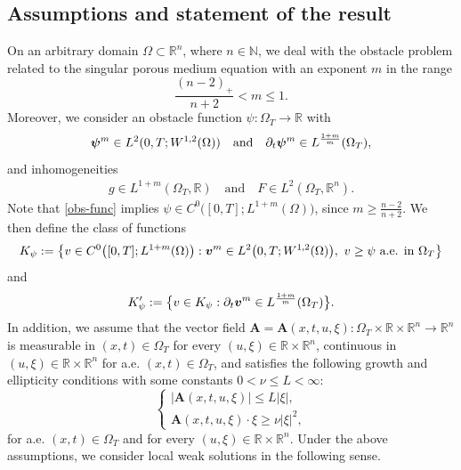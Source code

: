 \documentclass[a4paper, 10pt, american]{amsart}
\numberwithin{theorem}{section}
\numberwithin{equation}{section}
\def\N{\mathbb{N}}
\def\R{\mathbb{R}}
\newcommand{\power}[2]{\bm{#1^{\mbox{\unboldmath{\scriptsize$#2$}}}}}
\begin{document}
\subsection{Assumptions and statement of the result}
\label{sec:result}
On an arbitrary domain $\Omega\subset\R^n$, where $n\in\N$,
we deal with the obstacle problem related to
the singular porous medium equation with an exponent $m$
in the range
\begin{equation}
  \label{range-m}
  \frac{(n-2)_+}{n+2}<m\le1.
\end{equation}
Moreover, we consider an obstacle function $\psi : \Omega_T \rightarrow \R$ with
\begin{equation}\label{obs-func}
\power \psi m \in L^2(0,T; W^{1,2}(\Omega))\quad\mbox{and} \quad \partial_t \power \psi m \in L^{\frac{1+m}{m}}(\Omega_T),
\end{equation}
and inhomogeneities
\begin{align}\label{inhom-func}
g\in L^{1+m}(\Omega_T,\R)
\quad\mbox{and}\quad
F\in L^2(\Omega_T,\R^n).
\end{align}
Note that \eqref{obs-func} implies $\psi\in
C^0\big([0,T];L^{1+m}(\Omega)\big)$, since $m\ge\frac{n-2}{n+2}$.
We then define the class of functions
\begin{align*}
	K_{\psi}
	:=
	\big\{v \in C^0\big([0,T];L^{1+m}(\Omega)\big):
	\power v m\in L^2\big(0,T;W^{1,2}(\Omega)\big), \
	v\ge\psi\mbox{ a.e. in $\Omega_T$}\big\}
\end{align*}
and 
$$
	K_{\psi}'
	:=
	\big\{v\in K_{\psi}: \partial_t \power v m\in L^{\frac{1+m}{m}}(\Omega_T)\big\}.
$$
In addition, we assume that the vector field $\mathbf A=\mathbf
A(x,t,u,\xi)\colon \Omega_T\times \R\times\R^{n}\to\R^{n}$ is
measurable in $(x,t)\in\Omega_T$ for every $(u,\xi)\in\R\times\R^n$,
continuous in $(u,\xi)\in\R\times\R^n$ for a.e. $(x,t)\in\Omega_T$, and
satisfies the following growth and ellipticity conditions with some constants $0<\nu\le L<\infty$:
\begin{equation}\label{A-struc}
\left\{ \begin{array}{l}
|\mathbf{A}(x,t,u,\xi)| \leq L |\xi|,\\[0.6ex]
\mathbf{A}(x,t,u,\xi)\cdot \xi \geq \nu |\xi|^2,
\end{array}\right.\end{equation}
for a.e. $(x,t)\in\Omega_T$ and for every $(u,\xi)\in\R\times\R^n$.
Under the above assumptions, we consider local weak solutions in the
following sense.
\end{document}

